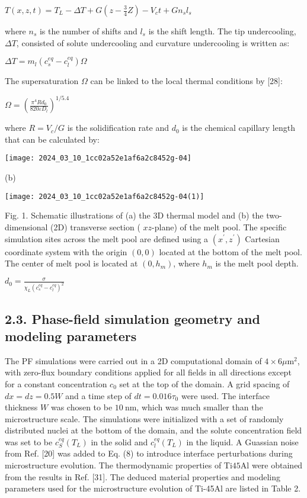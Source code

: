 \documentclass[10pt]{article}
\begin{document}
$T(x, z, t)=T_{L}-\Delta T+G\left(z-\frac{3}{4} Z\right)-V_{c} t+G n_{s} l_{s}$

where $n_{s}$ is the number of shifts and $l_{s}$ is the shift length. The tip undercooling, $\Delta T$, consisted of solute undercooling and curvature undercooling is written as:

$\Delta T=m_{l}\left(c_{s}^{e q}-c_{l}^{e q}\right) \Omega$

The supersaturation $\Omega$ can be linked to the local thermal conditions by [28]:

$\Omega=\left(\frac{\pi^{4} R d_{0}}{820 \varepsilon D_{l}}\right)^{1 / 5.4}$

where $R=V_{c} / G$ is the solidification rate and $d_{0}$ is the chemical capillary length that can be calculated by:

\begin{center}
\texttt{[image: 2024\_03\_10\_1cc02a52e1af6a2c8452g-04]}
\end{center}

(b)

\begin{center}
\texttt{[image: 2024\_03\_10\_1cc02a52e1af6a2c8452g-04(1)]}
\end{center}

Fig. 1. Schematic illustrations of (a) the 3D thermal model and (b) the two-dimensional (2D) transverse section ( $x z$-plane) of the melt pool. The specific simulation sites across the melt pool are defined using a $\left(x^{\prime}, z^{\prime}\right)$ Cartesian coordinate system with the origin $(0,0)$ located at the bottom of the melt pool. The center of melt pool is located at $\left(0, h_{m}\right)$, where $h_{m}$ is the melt pool depth.

$d_{0}=\frac{\sigma}{\chi_{L}\left(c_{s}^{e q}-c_{l}^{e q}\right)^{2}}$

\subsection*{2.3. Phase-field simulation geometry and modeling parameters}
The PF simulations were carried out in a 2D computational domain of $4 \times 6 \mu \mathrm{m}^{2}$, with zero-flux boundary conditions applied for all fields in all directions except for a constant concentration $c_{0}$ set at the top of the domain. A grid spacing of $d x=d z=0.5 W$ and a time step of $d t=0.016 \tau_{0}$ were used. The interface thickness $W$ was chosen to be $10 \mathrm{~nm}$, which was much smaller than the microstructure scale. The simulations were initialized with a set of randomly distributed nuclei at the bottom of the domain, and the solute concentration field was set to be $c_{S}^{e q}\left(T_{L}\right)$ in the solid and $c_{l}^{e q}\left(T_{L}\right)$ in the liquid. A Guassian noise from Ref. [20] was added to Eq. (8) to introduce interface perturbations during microstructure evolution. The thermodynamic properties of Ti$45 \mathrm{Al}$ were obtained from the results in Ref. [31]. The deduced material properties and modeling parameters used for the microstructure evolution of Ti-45Al are listed in Table 2.
\end{document}
